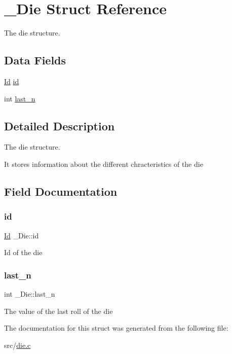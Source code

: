 \hypertarget{struct__Die}{}\section{\+\_\+\+Die Struct Reference}
\label{struct__Die}


The die structure.  


\subsection*{Data Fields}
\begin{DoxyCompactItemize}
\item 
\hyperlink{types_8h_a845e604fb28f7e3d97549da3448149d3}{Id} \hyperlink{struct__Die_a0887af562dda760409957f13619d36f1}{id}
\item 
int \hyperlink{struct__Die_abf73744a544920c64d79d84d964be62d}{last\+\_\+n}
\end{DoxyCompactItemize}


\subsection{Detailed Description}
The die structure. 

It stores information about the different chracteristics of the die 

\subsection{Field Documentation}
\mbox{\label{struct__Die_a0887af562dda760409957f13619d36f1}} 
\subsubsection{\texorpdfstring{id}{id}}
{\footnotesize\ttfamily \hyperlink{types_8h_a845e604fb28f7e3d97549da3448149d3}{Id} \+\_\+\+Die\+::id}

Id of the die \mbox{\label{struct__Die_abf73744a544920c64d79d84d964be62d}} 
\subsubsection{\texorpdfstring{last\+\_\+n}{last\_n}}
{\footnotesize\ttfamily int \+\_\+\+Die\+::last\+\_\+n}

The value of the last roll of the die 

The documentation for this struct was generated from the following file\+:\begin{DoxyCompactItemize}
\item 
src/\hyperlink{die_8c}{die.\+c}\end{DoxyCompactItemize}
